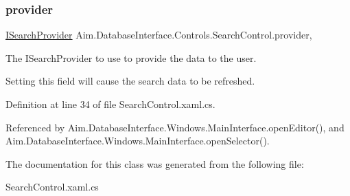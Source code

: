 \subsubsection{\texorpdfstring{provider}{provider}}
{\footnotesize\ttfamily \mbox{\hyperlink{interface_aim_1_1_database_interface_1_1_interfaces_1_1_i_search_provider}{I\+Search\+Provider}} Aim.\+Database\+Interface.\+Controls.\+Search\+Control.\+provider\hspace{0.3cm}{\ttfamily [get]}, {\ttfamily [set]}}



The I\+Search\+Provider to use to provide the data to the user. 

Setting this field will cause the search data to be refreshed. 

Definition at line 34 of file Search\+Control.\+xaml.\+cs.



Referenced by Aim.\+Database\+Interface.\+Windows.\+Main\+Interface.\+open\+Editor(), and Aim.\+Database\+Interface.\+Windows.\+Main\+Interface.\+open\+Selector().



The documentation for this class was generated from the following file\+:\begin{DoxyCompactItemize}
\item 
Search\+Control.\+xaml.\+cs\end{DoxyCompactItemize}
